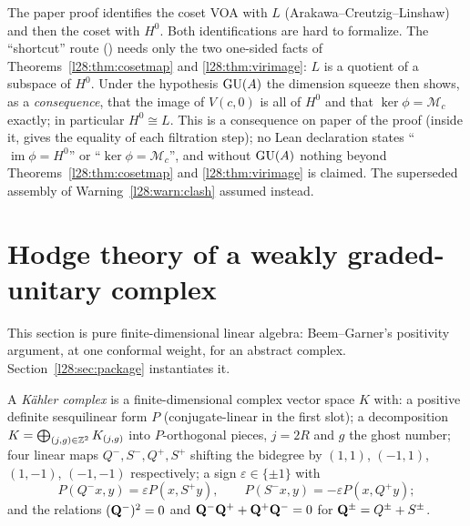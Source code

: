 \begin{remark}\label{l28:rem:noacl}
The paper proof identifies the coset VOA with $L$ (Arakawa--Creutzig--Linshaw) and then the coset with $H^0$. Both identifications are hard
to formalize. The ``shortcut'' route () needs only the two one-sided facts of Theorems~\ref{l28:thm:cosetmap} and
\ref{l28:thm:virimage}: $L$ is a quotient of a subspace of $H^0$. Under the hypothesis $\mathrm{GU}(A)$ the dimension
squeeze then shows, as a \emph{consequence}, that the image of $V(c,0)$ is all of $H^0$ and that $\ker\phi=\mathcal M_c$ exactly; in particular
$H^0\cong L$. This is a consequence on paper of the proof (inside it,  gives the equality of each filtration step);
no Lean declaration states ``$\operatorname{im}\phi=H^0$'' or ``$\ker\phi=\mathcal M_c$'', and without $\mathrm{GU}(A)$ nothing beyond
Theorems~\ref{l28:thm:cosetmap} and \ref{l28:thm:virimage} is claimed. The superseded assembly of
Warning~\ref{l28:warn:clash} assumed  instead.
\end{remark}

\section{Hodge theory of a weakly graded-unitary complex}\label{l28:sec:hodge}

This section is pure finite-dimensional linear algebra: Beem--Garner's positivity argument, at one conformal weight, for an abstract
complex. Section~\ref{l28:sec:package} instantiates it.

\begin{definition}\label{l28:def:kahler}
A \emph{Kähler complex} is a finite-dimensional complex vector space $K$ with:
a positive definite sesquilinear form $P$ (conjugate-linear in the first slot); a decomposition $K=\bigoplus_{(j,g)\in{\mathbb{Z}}^2}K_{(j,g)}$
into $P$-orthogonal pieces, $j=2R$ and $g$ the ghost number; four linear maps $Q^-,S^-,Q^+,S^+$ shifting the bidegree by $(1,1)$,
$(-1,1)$, $(1,-1)$, $(-1,-1)$ respectively; a sign $\varepsilon\in\{\pm1\}$ with
\begin{equation*}
P(Q^-x,y)=\varepsilon P(x,S^+y),\qquad P(S^-x,y)=-\varepsilon P(x,Q^+y);
\end{equation*}
and the relations $(\mathbf Q^-)^2=0$ and $\mathbf Q^-\mathbf Q^++\mathbf Q^+\mathbf Q^-=0$ for
$\mathbf Q^\pm=Q^\pm+S^\pm$.
\end{definition}


